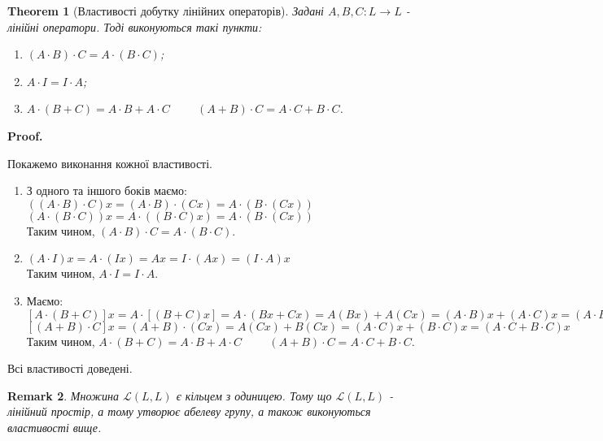 \documentclass[a4paper, 10pt]{article}
\makeatletter
\theoremstyle{theoremdd}
\newtheorem{theorem}{Theorem}[subsection]
\newtheorem{remark}[theorem]{Remark}
\renewenvironment{proof}[1][Proof.\\]{\par
\pushQED{\hfill \qed}%
\normalfont \topsep6\p@\@plus6\p@\relax
\trivlist
\item\relax
{\bfseries
#1\@addpunct{.}}\hspace\labelsep\ignorespaces
}{%
\popQED\endtrivlist\@endpefalse
}
\makeatother
\begin{document}
	\begin{theorem}[Властивості добутку лінійних операторів]
	Задані $A,B,C \colon L \to L$ - лінійні оператори. Тоді виконуються такі пункти:
	\begin{enumerate}[nosep, wide=0pt, label={\arabic*)}]
	\item $(A \cdot B) \cdot C = A \cdot (B \cdot C)$;
	\item $A \cdot I = I \cdot A$;
	\item $A \cdot (B+C) = A \cdot B + A \cdot C \hspace{1cm} (A+B) \cdot C = A \cdot C + B \cdot C$.
	\end{enumerate}
	\end{theorem}
	
	\begin{proof}
	Покажемо виконання кожної властивості.
	\begin{enumerate}[topsep=-\parskip, wide=0pt, label={\arabic*)}]
	\item З одного та іншого боків маємо:\\
	$((A \cdot B) \cdot C) x = (A \cdot B) \cdot (Cx) = A \cdot (B \cdot (Cx))$\\
	$(A \cdot (B \cdot C)) x = A \cdot ( (B \cdot C) x) = A \cdot (B \cdot (Cx))$\\
	Таким чином, $(A \cdot B) \cdot C = A \cdot (B \cdot C)$.
	\item $(A \cdot I) x = A \cdot (Ix) = A x = I \cdot (A x) = (I \cdot A) x$\\
	Таким чином, $A \cdot I = I \cdot A$.
	\item Маємо: \\
	$[A \cdot (B + C)]x = A \cdot [(B+C)x] = A \cdot (Bx + Cx) = A (Bx) + A (Cx) = (A \cdot B)x + (A \cdot C)x = (A \cdot B + A \cdot C)x$\\
	$[(A+B) \cdot C]x = (A+B) \cdot (Cx) = A (Cx) + B (Cx) = (A \cdot C)x + (B \cdot C)x = (A \cdot C + B \cdot C)x$\\
	Таким чином, $A \cdot (B+C) = A \cdot B + A \cdot C \hspace{1cm} (A+B) \cdot C = A \cdot C + B \cdot C$.
	\end{enumerate}
	Всі властивості доведені.
	\end{proof}
	
	\begin{remark}
	Множина $\mathcal{L}(L,L)$ є кільцем з одиницею. Тому що $\mathcal{L}(L,L)$ - лінійний простір, а тому утворює абелеву групу, а також виконуються властивості вище.
	\end{remark}
	
\end{document}

